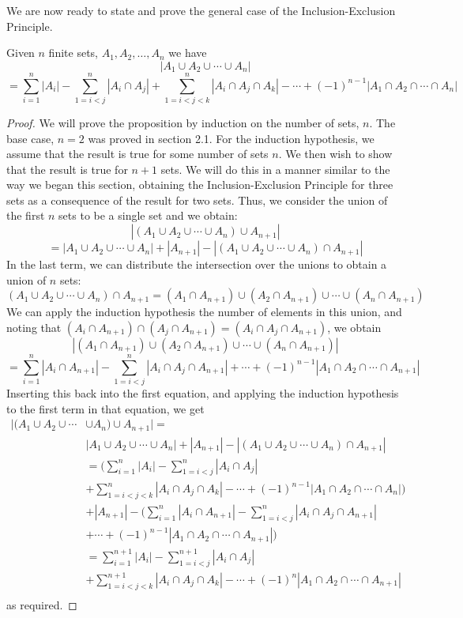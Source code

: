 \documentclass[handout]{ximera}
\begin{document}
We are now ready to state and prove the general case of the Inclusion-Exclusion Principle.
\begin{proposition}
Given $n$ finite sets, $A_1, A_2, \ldots, A_n$ we have
\[
|A_1 \cup A_2 \cup \cdots \cup A_n| 
\]
\[
= \sum_{i =1}^n |A_i| - \sum_{1 =i<j}^n |A_i\cap A_j| +
\sum_{1 =i<j< k}^n |A_i\cap A_j \cap A_k| - \cdots + (-1)^{n-1} |A_1 \cap A_2 \cap \cdots \cap A_n|
\]
\end{proposition}

\begin{proof}
We will prove the proposition by induction on the number of sets, $n$. The base case, $n=2$ was proved in section 2.1.
For the induction hypothesis, we assume that the result is true for some number of sets $n$. 
We then wish to show that the result is true for $n+1$ sets. We will do this in a manner similar to the way we began
this section, obtaining the Inclusion-Exclusion Principle for three sets as a consequence of the result for two sets.
Thus, we consider the union of the first $n$ sets to be a single set and we obtain:
\[
|(A_1 \cup A_2 \cup \cdots \cup A_n) \cup A_{n+1}| 
\]
\[
= |A_1 \cup A_2 \cup \cdots \cup A_n| + |A_{n+1}| - 
|(A_1 \cup A_2 \cup \cdots \cup A_n) \cap A_{n+1}|
\]
In the last term, we can distribute the intersection over the unions to obtain a union of $n$ sets:
\[
(A_1 \cup A_2 \cup \cdots \cup A_n) \cap A_{n+1} = 
(A_1 \cap A_{n+1}) \cup (A_2 \cap A_{n+1}) \cup \cdots \cup (A_n \cap A_{n+1})
\]
We can apply the induction hypothesis the number of elements in this union, and noting 
that $(A_i \cap A_{n+1}) \cap (A_j \cap A_{n+1})  = (A_i \cap A_j \cap A_{n+1})$, we obtain
\[
|(A_1 \cap A_{n+1}) \cup (A_2 \cap A_{n+1}) \cup \cdots \cup (A_n \cap A_{n+1})|
\]
\[
= \sum_{i = 1}^n |A_i \cap A_{n+1}| - \sum_{1 = i < j}^n |A_i \cap A_j \cap A_{n+1}| + \cdots + (-1)^{n-1} |A_1 \cap A_2 \cap \cdots \cap A_{n+1}|
\]
Inserting this back into the first equation, and applying the induction hypothesis to the 
first term in that equation, we get
\begin{align*}
|(A_1 \cup A_2 \cup \cdots &\cup A_n) \cup A_{n+1}|  = \\
& |A_1 \cup A_2 \cup \cdots \cup A_n| + |A_{n+1}| - |(A_1 \cup A_2 \cup \cdots \cup A_n) \cap A_{n+1}| \\
 &= \bigg( \sum_{i =1}^n |A_i| - \sum_{1 =i<j}^n |A_i\cap A_j| \\
 & +\sum_{1 =i<j< k}^n |A_i\cap A_j \cap A_k| - \cdots + (-1)^{n-1} |A_1 \cap A_2 \cap \cdots \cap A_n|\bigg) \\
  &+ |A_{n+1}| - \bigg(\sum_{i = 1}^n |A_i \cap A_{n+1}| - \sum_{1 = i < j}^n |A_i \cap A_j \cap A_{n+1}| \\
  &+ \cdots + (-1)^{n-1} |A_1 \cap A_2 \cap \cdots \cap A_{n+1}|\bigg)\\
  &= \sum_{i =1}^{n+1} |A_i| - \sum_{1 =i<j}^{n+1} |A_i\cap A_j| \\
& +\sum_{1 =i<j< k}^{n+1} |A_i\cap A_j \cap A_k| - \cdots + (-1)^{n} |A_1 \cap A_2 \cap \cdots \cap A_{n+1}| \\
\end{align*}
as required.

\end{proof}
\end{document}
